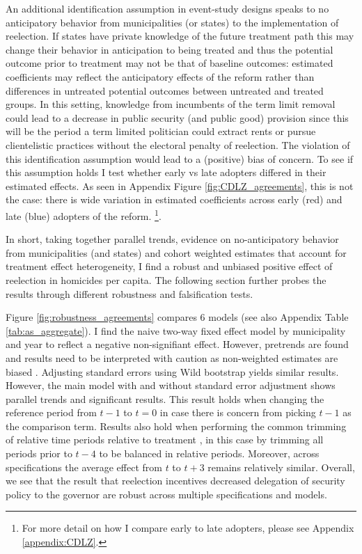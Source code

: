 \documentclass[12pt]{amsart}
\makeatletter
\def\section{\@startsection{section}{1}
	\z@{1.0\linespacing\@plus\linespacing}{.5\linespacing}{\Large}}
\numberwithin{equation}{section}
\theoremstyle{definition}
\theoremstyle{definition}
\theoremstyle{definition}
\makeatother
\begin{document}
An additional identification assumption in event-study designs speaks to no anticipatory behavior from municipalities (or states) to the implementation of reelection. If states have private knowledge of the future treatment path this may change their behavior in anticipation to being treated and thus the potential outcome prior to treatment may not be that of baseline outcomes: estimated coefficients may reflect the anticipatory effects of the reform rather than differences in untreated potential outcomes between untreated and treated groups. %
In this setting, knowledge from incumbents of the term limit removal could lead to a decrease in public security (and public good) provision since this will be the period a term limited politician could extract rents or pursue clientelistic practices without the electoral penalty of reelection. The violation of this identification assumption would lead to a (positive) bias of concern. To see if this assumption holds I test whether early vs late adopters differed in their estimated effects. As seen in Appendix Figure \ref{fig:CDLZ_agreements}, this is not the case: there is wide variation in estimated coefficients across early (red) and late (blue) adopters of the reform. \footnote{For more detail on how I compare early to late adopters, please see Appendix \ref{appendix:CDLZ}.}.  

In short, taking together parallel trends, evidence on no-anticipatory behavior from municipalities (and states) and cohort weighted estimates that account for treatment effect heterogeneity, I find a robust and unbiased positive effect of reelection in homicides per capita.  The following section further probes the results through different robustness and falsification tests.
       

\section{Robustness}
 
  Figure \ref{fig:robustness_agreements} compares 6 models (see also Appendix Table \ref{tab:as_aggregate}). I find the naive two-way fixed effect model by municipality and year to reflect a negative non-signifiant effect. However, pretrends are found and results need to be interpreted with caution as non-weighted estimates are biased \citet{abraham_sun_2020}. Adjusting standard errors using Wild bootstrap yields similar results. However, the main model with and without standard error adjustment shows parallel trends and significant results. This result holds when changing the reference period from $t-1$ to $t=0$ in case there is concern from picking  $t-1$ as the comparison term. Results also hold when performing the common trimming of relative time periods relative to treatment \citep{borusyak_2017, dobkin_etal_2018}, in this case by trimming all periods prior to $t-4$ to be balanced in relative periods. Moreover, across specifications the average effect from $t$ to $t+3$ remains relatively similar. Overall, we see that the result that reelection incentives decreased delegation of security policy to the governor are robust across multiple specifications and models.
        
\end{document}
